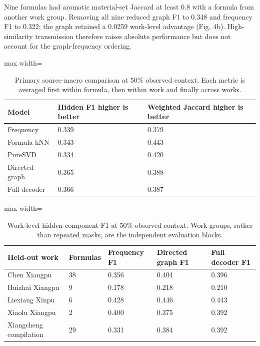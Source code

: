 \documentclass[11pt]{article}
\begin{document}
Nine formulas had aromatic material-set Jaccard at least 0.8 with a formula from another work group. Removing all nine reduced graph F1 to 0.348 and frequency F1 to 0.322; the graph retained a 0.0259 work-level advantage (Fig. 4b). High-similarity transmission therefore raises absolute performance but does not account for the graph-frequency ordering.

\begin{table}[htbp]
\centering
\small
\caption{Primary source-macro comparison at 50\% observed context. Each metric is averaged first within formula, then within work and finally across works.}
\label{tab:4}
\begin{adjustbox}{max width=\linewidth}
\begin{tabular}{@{}lll@{}}
\toprule
\textbf{Model} & \textbf{Hidden F1 higher is better} & \textbf{Weighted Jaccard higher is better} \\
\midrule
Frequency & 0.339 & 0.379 \\
Formula kNN & 0.343 & 0.443 \\
PureSVD & 0.334 & 0.420 \\
Directed graph & 0.365 & 0.388 \\
Full decoder & 0.366 & 0.387 \\
\bottomrule
\end{tabular}
\end{adjustbox}
\end{table}

\begin{table}[htbp]
\centering
\small
\caption{Work-level hidden-component F1 at 50\% observed context. Work groups, rather than repeated masks, are the independent evaluation blocks.}
\label{tab:5}
\begin{adjustbox}{max width=\linewidth}
\begin{tabular}{@{}lllll@{}}
\toprule
\textbf{Held-out work} & \textbf{Formulas} & \textbf{Frequency F1} & \textbf{Directed graph F1} & \textbf{Full decoder F1} \\
\midrule
Chen Xiangpu & 38 & 0.356 & 0.404 & 0.396 \\
Huizhai Xiangpu & 9 & 0.178 & 0.218 & 0.210 \\
Liexiang Xinpu & 6 & 0.428 & 0.446 & 0.443 \\
Xiaolu Xiangpu & 2 & 0.400 & 0.375 & 0.392 \\
Xiangcheng compilation & 29 & 0.331 & 0.384 & 0.392 \\
\bottomrule
\end{tabular}
\end{adjustbox}
\end{table}
\end{document}
